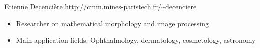 \documentclass[xcolor=pdftex,dvipsnames,table,mathserif]{beamer}
\begin{document}
{\begin{columns}
\begin{column}{.8\textwidth}
    \begin{block}{Etienne Decencière \hfill \scriptsize{\url{http://cmm.mines-paristech.fr/\~decenciere}}}
      \scriptsize{
    \begin{itemize}
    \item Researcher on mathematical morphology and image processing
    \item Main application fields: Ophthalmology, dermatology, cosmetology, astronomy
    \end{itemize}
    }
  \end{block}

  \end{column}
\end{columns}



}






\end{document}
